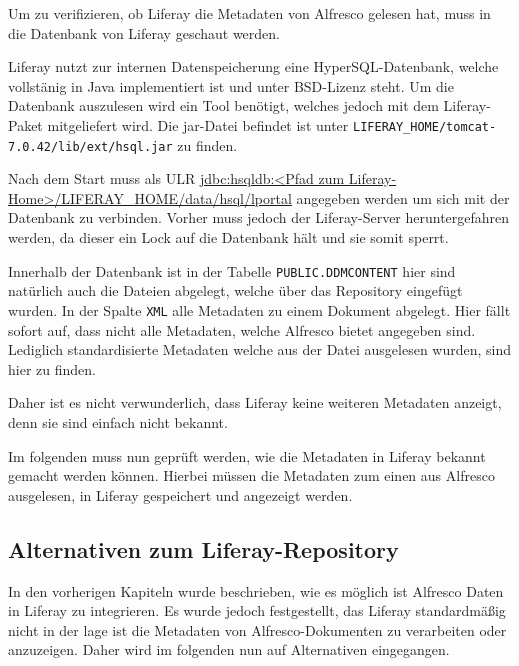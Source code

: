 Um zu verifizieren, ob Liferay die Metadaten von Alfresco gelesen hat, muss in die Datenbank von Liferay geschaut werden.

Liferay nutzt zur internen Datenspeicherung eine HyperSQL-Datenbank, welche vollst\"anig in Java implementiert ist und unter BSD-Lizenz steht. Um die Datenbank auszulesen wird ein Tool ben\"otigt, welches jedoch mit dem Liferay-Paket mitgeliefert wird. Die jar-Datei befindet ist unter \texttt{LIFERAY\_HOME/tomcat-7.0.42/lib/ext/hsql.jar} zu finden.

Nach dem Start muss als ULR \url{jdbc:hsqldb:<Pfad zum Liferay-Home>/LIFERAY\_HOME/data/hsql/lportal} angegeben werden um sich mit der Datenbank zu verbinden. Vorher muss jedoch der Liferay-Server heruntergefahren werden, da dieser ein Lock auf die Datenbank h\"alt und sie somit sperrt.

Innerhalb der Datenbank ist in der Tabelle \texttt{PUBLIC.DDMCONTENT} hier sind nat\"urlich auch die Dateien abgelegt, welche \"uber das Repository eingef\"ugt wurden. In der Spalte \texttt{XML} alle Metadaten zu einem Dokument abgelegt. Hier f\"allt sofort auf, dass nicht alle Metadaten, welche Alfresco bietet angegeben sind. Lediglich standardisierte Metadaten welche aus der Datei ausgelesen wurden, sind hier zu finden. 

Daher ist es nicht verwunderlich, dass Liferay keine weiteren Metadaten anzeigt, denn sie sind einfach nicht bekannt.

Im folgenden muss nun gepr\"uft werden, wie die Metadaten in Liferay bekannt gemacht werden k\"onnen. Hierbei m\"ussen die Metadaten zum einen aus Alfresco ausgelesen, in Liferay gespeichert und angezeigt werden.

\subsection{Alternativen zum Liferay-Repository}
In den vorherigen Kapiteln wurde beschrieben, wie es m\"oglich ist Alfresco Daten in Liferay zu integrieren. Es wurde jedoch festgestellt, das Liferay standardm\"a\ss{}ig nicht in der lage ist die Metadaten von Alfresco-Dokumenten zu verarbeiten oder anzuzeigen. Daher wird im folgenden nun auf Alternativen eingegangen.